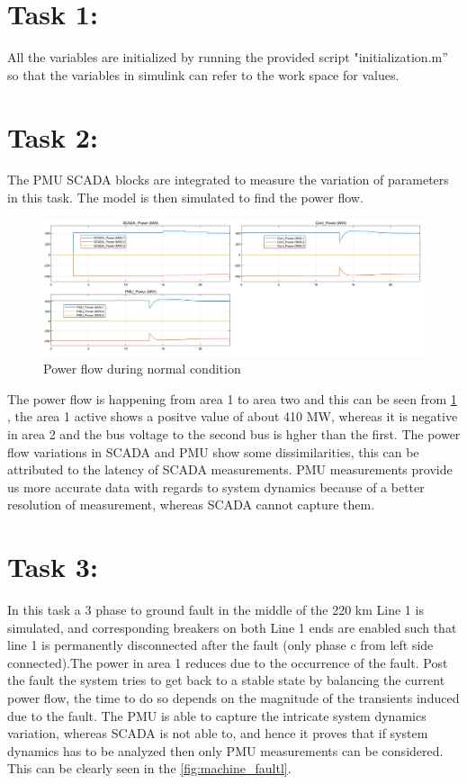 \justifying

\section*{\textbf{Task 1}:}

 All the variables are initialized by running the provided script "initialization.m”  so that the variables in simulink can refer to the work space for values.

\section*{\textbf{Task 2}:} 
The PMU SCADA blocks are integrated to measure the variation of parameters in this task. The model is then simulated to find the power flow.
\begin{figure}[H]
    \centering
        \includegraphics[width=0.8 \linewidth]{images_a4/T2.png}
        \caption{Power flow during normal condition}
        \label{fig:Power flow normal}   
\end{figure}
The power flow is happening from area 1 to area two and this can be seen from \ref{fig:Power flow normal} , the area 1 active shows a positve value of about 410 MW, whereas it is negative in area 2 and the bus voltage to the second bus is hgher than the first.
The power flow variations in SCADA and PMU show some dissimilarities, this can be attributed to the latency of SCADA measurements. PMU measurements provide us more accurate data with regards to system dynamics because of a better resolution of measurement, whereas SCADA cannot capture them.

\section*{\textbf{Task 3}:} In this task a 3 phase  to ground  fault in the middle of the 220 km Line 1  is simulated, and corresponding breakers on both Line 1 ends are enabled such that line 1 is permanently disconnected after the fault (only phase c from left side connected).The power in area 1 reduces due to the occurrence of the fault. Post the fault the system tries to get back to a stable state by balancing the current power flow, the time to do so depends on the magnitude of the transients induced due to the fault.
The PMU is able to capture the intricate system dynamics variation, whereas SCADA is not able to, and hence it proves that if system dynamics has to be analyzed then only PMU measurements can be considered. This can be clearly seen in the \ref{fig:machine_faultl}.

